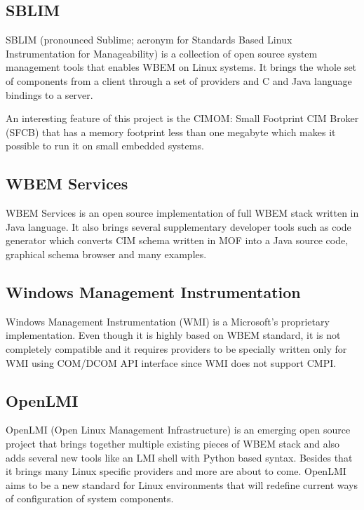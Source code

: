 \subsection{SBLIM}
\label{wbem:implementations:sblim}

SBLIM (pronounced Sublime; acronym for Standards Based Linux Instrumentation for
Manageability) is a collection of open source system management tools that
enables WBEM on Linux systems. It brings the whole set of components from a
client through a set of providers and C and Java language bindings to a server.

An interesting feature of this project is the CIMOM: Small Footprint CIM
Broker (SFCB) that has a memory footprint less than one megabyte which makes it
possible to run it on small embedded systems.

\subsection{WBEM Services}
\label{wbem:implementations:wbemservices}

WBEM Services is an open source implementation of full WBEM stack written in
Java language. It also brings several supplementary developer tools such as code
generator which converts CIM schema written in MOF into a Java source code,
graphical schema browser and many examples.

\subsection{Windows Management Instrumentation}
\label{wbem:implementations:wmi}

Windows Management Instrumentation (WMI) is a Microsoft's proprietary
implementation. Even though it is highly based on WBEM standard, it is not
completely compatible and it requires providers to be specially written only for
WMI using COM/DCOM API interface since WMI does not support CMPI.

\subsection{OpenLMI}
\label{wbem:implementations:openlmi}

OpenLMI (Open Linux Management Infrastructure) is an emerging open source
project that brings together multiple existing pieces of WBEM stack and also
adds several new tools like an LMI shell with Python based syntax. Besides that
it brings many Linux specific providers and more are about to come. OpenLMI aims
to be a new standard for Linux environments that will redefine current ways of
configuration of system components.
